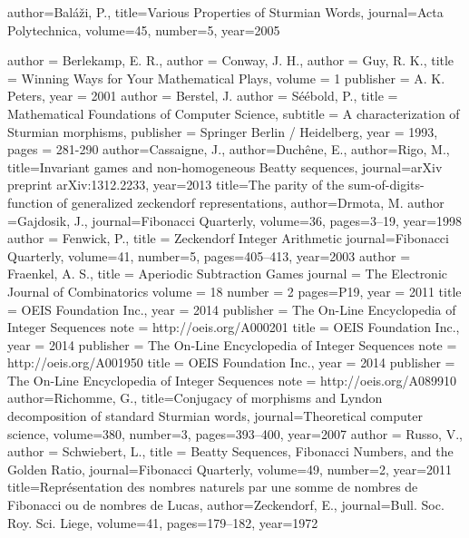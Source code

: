 \documentclass[english,12pt]{article}
\begin{document}
\begin{bibdiv}
\begin{biblist}
{

 author={Bal{\'a}{\v{z}}i, P.},
  title={Various Properties of Sturmian Words},
  journal={Acta Polytechnica},
  volume={45},
  number={5},
  year={2005}
}
{
 author = {Berlekamp, E. R.},
 author = {Conway, J. H.},
 author = {Guy, R. K.},
 title = {Winning Ways for Your Mathematical Plays},
 volume = {1}
 publisher = {A. K. Peters},
 year = {2001}
}
{
 author = {Berstel, J.}
 author = {S\'e\'ebold, P.}, 
 title = {Mathematical Foundations of Computer Science}, 
 subtitle = {A characterization of Sturmian morphisms},
 publisher = {Springer Berlin / Heidelberg},
 year = {1993}, 
 pages = {281-290}
}
{
 author={Cassaigne, J.},
 author={Duch{\^e}ne, E.},
 author={Rigo, M.},
  title={Invariant games and non-homogeneous Beatty sequences},
  journal={arXiv preprint arXiv:1312.2233},
  year={2013}
}
{
 title={The parity of the sum-of-digits-function of generalized zeckendorf representations},
  author={Drmota, M.}
  author ={Gajdosik, J.},
  journal={Fibonacci Quarterly},
  volume={36},
  pages={3--19},
  year={1998}
}
{
 author = {Fenwick, P.},
 title = {Zeckendorf Integer Arithmetic}
 journal={Fibonacci Quarterly},
 volume={41},
 number={5},
 pages={405--413},
 year={2003}
}
{
 author = {Fraenkel, A. S.},
 title = {Aperiodic Subtraction Games}
 journal = {The Electronic Journal of Combinatorics}
 volume = {18}
 number = {2}
 pages={P19},
 year = {2011}
}
{
 title = {OEIS Foundation Inc.},
 year = {2014}
 publisher = {The On-Line Encyclopedia of Integer Sequences}
 note = {http://oeis.org/A000201}
}
{
 title = {OEIS Foundation Inc.},
 year = {2014}
 publisher = {The On-Line Encyclopedia of Integer Sequences}
 note = {http://oeis.org/A001950}
}
{
 title = {OEIS Foundation Inc.},
 year = {2014}
 publisher = {The On-Line Encyclopedia of Integer Sequences}
 note = {http://oeis.org/A089910}
}
{
  author={Richomme, G.},
  title={Conjugacy of morphisms and Lyndon decomposition of standard Sturmian words},
  journal={Theoretical computer science},
  volume={380},
  number={3},
  pages={393--400},
  year={2007}
}
{
 author = {Russo, V.},
 author = {Schwiebert, L.},
 title = {Beatty Sequences, Fibonacci Numbers, and the Golden Ratio},
 journal={Fibonacci Quarterly},
 volume={49},
 number={2},
 year={2011}
}
{
  title={Repr{\'e}sentation des nombres naturels par une somme de nombres de Fibonacci ou de nombres de Lucas},
  author={Zeckendorf, E.},%
  journal={Bull. Soc. Roy. Sci. Liege},
  volume={41},
  pages={179--182},
  year={1972}
}
\end{biblist}
\end{bibdiv}
\end{document}
